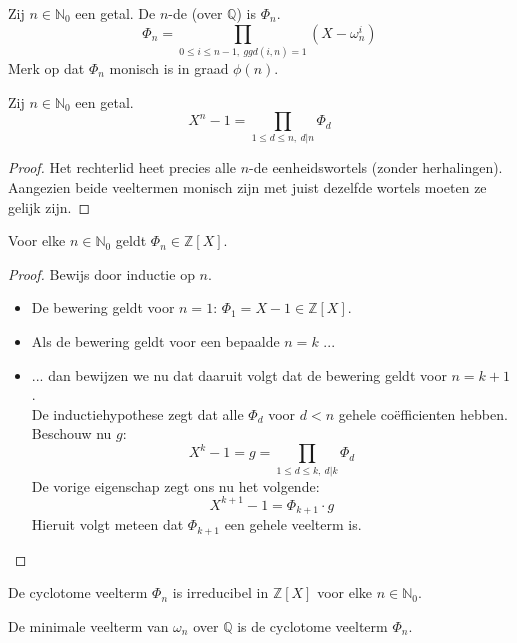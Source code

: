\documentclass[main.tex]{subfiles}
\begin{document}
\begin{de}
  Zij $n\in \mathbb{N}_{0}$ een getal.
  De $n$-de  (over $\mathbb{Q}$) is $\Phi_{n}$.
  \[ \Phi_{n} = \prod_{0\le i \le n-1,\ ggd(i,n)= 1}(X-\omega_{n}^{i})\]
  Merk op dat $\Phi_{n}$ monisch is in graad $\phi(n)$.
\end{de}

\begin{ei}
  \label{ei:formule-n-degraads-eenheidsveelterm}
  Zij $n\in \mathbb{N}_{0}$ een getal.
  \[ X^{n}-1 = \prod_{1\le d\le n,\ d|n}\Phi_{d} \]
  \begin{proof}
    Het rechterlid heet precies alle $n$-de eenheidswortels (zonder herhalingen).\waarom
    Aangezien beide veeltermen monisch zijn met juist dezelfde wortels moeten ze gelijk zijn.
  \end{proof}
\end{ei}

\begin{pr}
  Voor elke $n\in \mathbb{N}_{0}$ geldt $\Phi_{n} \in \mathbb{Z}[X]$.

  \begin{proof}
    Bewijs door inductie op $n$.
    \begin{itemize}
    \item De bewering geldt voor $n=1$: $\Phi_{1} = X-1 \in \mathbb{Z}[X]$. 
    \item Als de bewering geldt voor een bepaalde $n=k$ ...
    \item ... dan bewijzen we nu dat daaruit volgt dat de bewering geldt voor $n=k+1$.\\
      De inductiehypothese zegt dat alle $\Phi_{d}$ voor $d<n$ gehele co\"efficienten hebben.
      Beschouw nu $g$:
      \[ X^{k}-1 = g = \prod_{1\le d\le k,\ d|k}\Phi_{d}\]
      De vorige eigenschap zegt ons nu het volgende:
      \[ X^{k+1}-1 = \Phi_{k+1}\cdot g\]
      Hieruit volgt meteen dat $\Phi_{k+1}$ een gehele veelterm is.
    \end{itemize}
  \end{proof}
\end{pr}

\begin{st}
  De cyclotome veelterm $\Phi_{n}$ is irreducibel in $\mathbb{Z}[X]$ voor elke $n\in \mathbb{N}_{0}$.
  \zb
\end{st}

\begin{gev}
  De minimale veelterm van $\omega_{n}$ over $\mathbb{Q}$ is de cyclotome veelterm $\Phi_{n}$.
  \zb
\end{gev}
\end{document}
